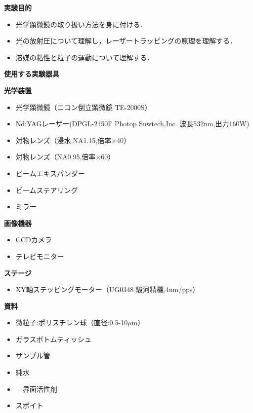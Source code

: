 \documentclass[11pt, a4paper,twocolumn]{jarticle}
\begin{document}
\begin{center}
    \textbf{\Large 実験目的}\\
    \begin{flushleft}
        \begin{itemize}
            \item 光学顕微鏡の取り扱い方法を身に付ける．
            \item 光の放射圧について理解し，レーザートラッピングの原理を理解する．
            \item 溶媒の粘性と粒子の運動について理解する．
        \end{itemize}
    \end{flushleft}
    \textbf{\Large 使用する実験器具}\\
    \begin{flushleft}
        \textbf{光学装置}
        \begin{itemize}
            \item 光学顕微鏡（ニコン倒立顕微鏡 TE-2000S）
            \item Nd:YAGレーザー(DPGL-2150F Photop Suwtech,Inc. 波長532nm,出力160W)
            \item 対物レンズ（浸水,NA1.15,倍率$\times$40）
            \item 対物レンズ（NA0.95,倍率$\times$60）
            \item ビームエキスパンダー
            \item ビームステアリング
            \item ミラー
        \end{itemize}
        \textbf{画像機器}
        \begin{itemize}
            \item CCDカメラ
            \item テレビモニター
        \end{itemize}
        \textbf{ステージ}
        \begin{itemize}
            \item XY軸ステッピングモーター（UG0348 駿河精機,4nm/pps）
        \end{itemize}
        \textbf{資料}
        \begin{itemize}
            \item 微粒子:ポリスチレン球（直径:0.5-10$\mu$m）
            \item ガラスボトムティッシュ
            \item サンプル管
            \item 純水
            \item　界面活性剤
            \item スポイト
        \end{itemize}
    \end{flushleft}
\end{center}
\end{document}
